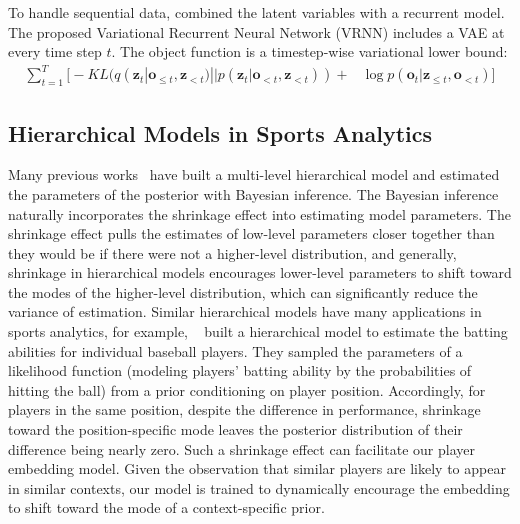 \documentclass[letterpaper]{article} %
\newcommand{\latentvariables}{\mathbf{z}}
\newcommand{\inference}{q}
\newcommand{\generation}{p}
\newcommand{\observation}{\boldsymbol{o}}
\begin{document}
To handle sequential data, \citeauthor{ChungKDGCB15} combined the latent variables with a recurrent model.
The proposed Variational Recurrent Neural Network (VRNN) includes a VAE at every time step $t$. The object function is a timestep-wise variational lower bound:
\begin{align}
     \sum_{t=1}^{T}\Big[-KL(\inference(\latentvariables_{t}|\observation_{\leq t},\latentvariables_{<t})||p(\latentvariables_{t}|\observation_{< t},\latentvariables_{<t}))+
    & \log\generation(\observation_{t}|\latentvariables_{\leq t},\observation_{<t})\Big]
\end{align}

\subsection{Hierarchical Models in Sports Analytics}
Many previous works~\cite{Gelman06,davis2015simulator}
have built a multi-level hierarchical model and estimated the parameters of the posterior with Bayesian inference.
The Bayesian inference naturally incorporates the shrinkage effect into estimating model parameters. The shrinkage effect pulls the estimates of low-level parameters closer together than they would be if there were not a higher-level distribution, and generally, shrinkage in hierarchical models encourages lower-level parameters to shift toward the modes of the higher-level distribution, which can significantly reduce the variance of estimation. 
Similar hierarchical models have many applications in sports analytics, for example, ~\citeauthor{kruschke2014doing} built a hierarchical model to estimate the batting abilities for individual baseball players.
They sampled the parameters of a likelihood function (modeling players' batting ability by the probabilities of hitting the ball) from a prior conditioning on player position.
Accordingly, for players in the same position, despite the difference in performance, shrinkage toward the position-specific mode leaves the posterior distribution of their difference being nearly zero.
Such a shrinkage effect can facilitate our player embedding model. Given the observation that similar players are likely to appear in similar contexts, our model is trained to dynamically encourage the embedding to shift toward the mode of a context-specific prior.
\end{document}
